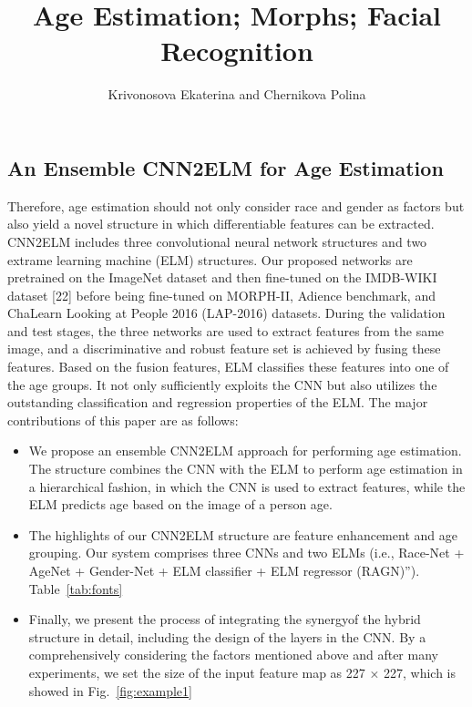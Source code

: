 \documentclass[12pt]{spieman}  %
\title{Age Estimation; Morphs; Facial Recognition}
\author[a]{Krivonosova Ekaterina and Chernikova Polina}
\affil[a]{Samara University}
\begin{document}
 
\maketitle

\begin{spacing}{2}   %

\section{An Ensemble CNN2ELM for Age Estimation}
\label{sect:intro}  %
Therefore, age estimation should not only consider race and gender as factors but also yield a novel structure in which differentiable features can be extracted. CNN2ELM includes three convolutional neural network  structures and two extrame learning machine (ELM) structures. Our proposed networks are pretrained on the ImageNet dataset and then fine-tuned on the IMDB-WIKI dataset [22] before being fine-tuned on MORPH-II, Adience benchmark, and ChaLearn Looking at People 2016 (LAP-2016) datasets. During the validation and test stages, the three networks are used to extract features from the same image, and a discriminative and robust feature set is achieved by fusing these features. Based on the fusion features, ELM classifies these features into one of the age groups. It not only sufficiently exploits the CNN but also utilizes the outstanding classification and regression properties of the ELM. The major contributions of this paper are as follows: 

\begin{itemize}
  \item {We propose an ensemble CNN2ELM approach for performing age estimation. The structure combines the CNN with the ELM to perform age estimation in a hierarchical fashion, in which the CNN is used to extract features, while the ELM predicts age based on the image of a person age.}
  \item The highlights of our CNN2ELM structure are feature enhancement and age grouping. Our system comprises three CNNs and two ELMs (i.e., Race-Net + AgeNet + Gender-Net + ELM classifier + ELM regressor (RAGN)”). Table~\ref{tab:fonts}
  \item Finally, we present the process of integrating the synergyof the hybrid structure in detail, including the design of the layers in the CNN. By a comprehensively considering the factors mentioned above and after many experiments, we set the size of the input feature map as 227 × 227, which is showed in Fig.~\ref{fig:example1}
\end{itemize}


\end{spacing}
\end{document}
